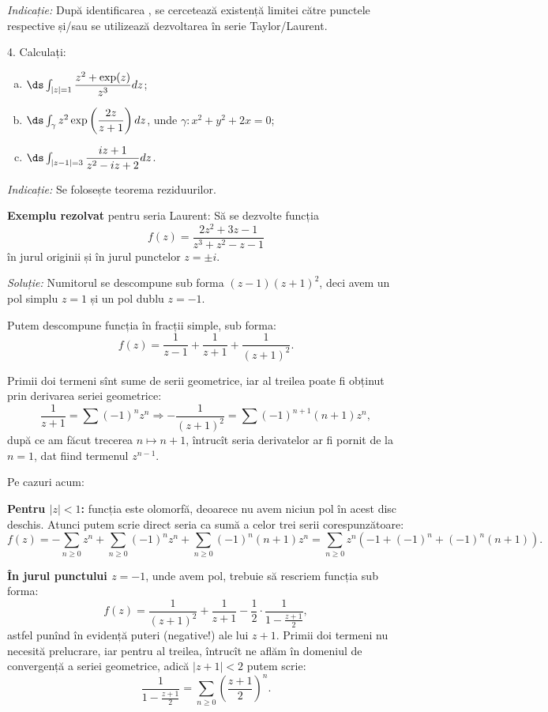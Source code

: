 \emph{Indicație:} După identificarea , se cercetează
existență limitei către punctele respective și/sau se utilizează dezvoltarea
în serie Taylor/Laurent.

\vspace{0.3cm}

4. Calculați:
\begin{enumerate}[(a)]
\item $ \ds\int_{|z| = 1} \dfrac{z^2 + \exp(z)}{z^3} dz $;
\item $ \ds\int_\gamma z^2 \exp\left(\dfrac{2z}{z+1}\right) dz $, unde
  $ \gamma: x^2 + y^2 + 2x = 0 $;
\item $ \ds\int_{|z - 1| = 3} \dfrac{iz + 1}{z^2 - iz + 2} dz $.
\end{enumerate}

\emph{Indicație:} Se folosește teorema reziduurilor.

\vspace{0.3cm}

\textbf{Exemplu rezolvat} pentru seria Laurent: Să se dezvolte funcția
\[
  f(z) = \dfrac{2z^2 + 3z - 1}{z^3 + z^2 - z - 1}
\]
în jurul originii și în jurul punctelor $ z = \pm i $.

\emph{Soluție:} Numitorul se descompune sub forma $ (z - 1)(z + 1)^2 $,
deci avem un pol simplu $ z = 1 $ și un pol dublu $ z = - 1 $.

Putem descompune funcția în fracții simple, sub forma:
\[
  f(z) = \dfrac{1}{z - 1} + \dfrac{1}{z + 1} + \dfrac{1}{(z + 1)^2}.
\]

Primii doi termeni sînt sume de serii geometrice, iar al treilea poate
fi obținut prin derivarea seriei geometrice:
\[
  \dfrac{1}{z + 1} = \sum (-1)^n z^n \Rightarrow %
  -\dfrac{1}{(z + 1)^2} = \sum (-1)^{n+1} (n + 1) z^n,
\]
după ce am făcut trecerea $ n \mapsto n + 1 $, întrucît seria derivatelor
ar fi pornit de la $ n = 1 $, dat fiind termenul $ z^{n-1} $.

Pe cazuri acum:

\textbf{Pentru $ |z| < 1 $:} funcția este olomorfă, deoarece nu avem
niciun pol în acest disc deschis. Atunci putem scrie direct seria ca sumă
a celor trei serii corespunzătoare:
\[
  f(z) = -\sum_{n \geq 0} z^n + \sum_{n \geq 0} (-1)^n z^n + %
  \sum_{n \geq 0} (-1)^n (n + 1)z^n = %
  \sum_{n \geq 0} z^n \left( -1 + (-1)^n + (-1)^n(n + 1)\right).
\]

\textbf{În jurul punctului $ z = - 1 $}, unde avem pol,
trebuie să rescriem funcția sub forma:
\[
  f(z) = \dfrac{1}{(z + 1)^2} + \dfrac{1}{z + 1} - %
  \dfrac{1}{2} \cdot \dfrac{1}{1 - \frac{z + 1}{2}},
\]
astfel punînd în evidență puteri (negative!) ale lui $ z + 1 $. Primii doi
termeni nu necesită prelucrare, iar pentru al treilea, întrucît
ne aflăm în domeniul de convergență a seriei geometrice, adică $ |z + 1| < 2 $
putem scrie:
\[
  \dfrac{1}{1 - \frac{z + 1}{2}} = \sum_{n \geq 0} \left( \dfrac{z + 1}{2} \right)^n.
\]

